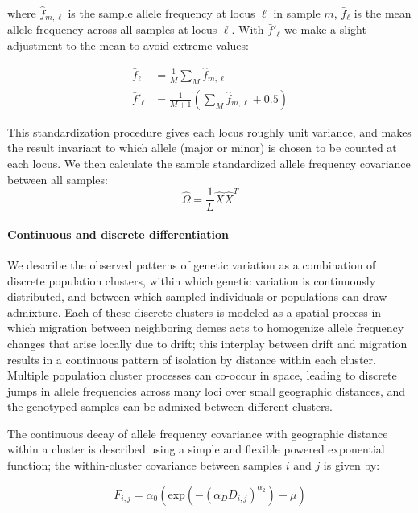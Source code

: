 \documentclass[12pt]{article}
\begin{document}
where $\hat{f}_{m,\ell}$ is the sample allele frequency at locus $\ell$ in sample $m$,
$\bar{f}_{\ell}$ is the mean allele frequency across all samples at locus $\ell$.
With $\bar{f}'_{\ell}$ we make a slight adjustment to the mean to avoid extreme values:

\begin{align}
\bar{f}_{\ell} &= \frac{1}{M}\sum\limits_{M}\hat{f}_{m,\ell}\\
\bar{f}'_{\ell} &= \frac{1}{M+1}\left(\sum\limits_{M}\hat{f}_{m,\ell}+ 0.5\right)
\end{align}

This standardization procedure gives each locus roughly unit variance, 
and makes the result invariant to which allele (major or minor) is chosen to be counted at each locus.
We then calculate the sample standardized allele frequency covariance between all samples:
\begin{equation}
\widehat{\Omega} = \frac{1}{L}  \hat{X}\hat{X}^T
\label{sample_covariance}
\end{equation}

\paragraph{Continuous and discrete differentiation}
We describe the observed patterns of genetic variation as a combination of discrete population clusters,
within which genetic variation is continuously distributed, 
and between which sampled individuals or populations can draw admixture.
Each of these discrete clusters is modeled as a spatial process
in which migration between neighboring demes acts 
to homogenize allele frequency changes that arise locally due to drift;
this interplay between drift and migration 
results in a continuous pattern of isolation by distance within each cluster.
Multiple population cluster processes can co-occur in space, 
leading to discrete jumps in allele frequencies across many loci over small geographic distances,
and the genotyped samples can be admixed between different clusters.

The continuous decay of allele frequency covariance with geographic distance 
within a cluster is described using a simple and flexible powered exponential function;
the within-cluster covariance between samples $i$ and $j$ is given by:

\begin{equation}
F_{i,j} = \alpha_0 \left( \text{exp} \left( -(\alpha_D D_{i,j}) ^ {\alpha_2}	\right) + \mu \right)
\label{within_cluster_covariance}
\end{equation}
\end{document}
